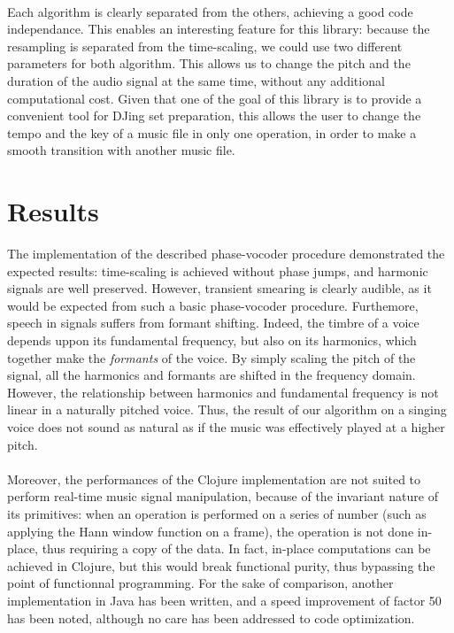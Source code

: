 \documentclass[letterpaper]{article}
\theoremstyle{definition}
\theoremstyle{remark}
\begin{document}
\paragraph{}
Each algorithm is clearly separated from the others, achieving a good code
independance. This enables an interesting feature for this library: because the
resampling is separated from the time-scaling, we could use two different
parameters for both algorithm. This allows us to change the pitch and the
duration of the audio signal at the same time, without any additional
computational cost. Given that one of the goal of this library is to provide a
convenient tool for DJing set preparation, this allows the user to change the
tempo and the key of a music file in only one operation, in order to make a
smooth transition with another music file.

\section{Results}
The implementation of the described phase-vocoder procedure demonstrated the
expected results: time-scaling is achieved without phase jumps, and harmonic
signals are well preserved. However, transient smearing is clearly audible, as
it would be expected from such a basic phase-vocoder procedure. Furthemore,
speech in signals suffers from formant shifting. Indeed, the timbre of a voice
depends uppon its fundamental frequency, but also on its harmonics, which
together make the \emph{formants} of the voice. By simply scaling the pitch
of the signal, all the harmonics and formants are shifted in the frequency
domain. However, the relationship between harmonics and fundamental frequency
is not linear in a naturally pitched voice. Thus, the result of our algorithm
on a singing voice does not sound as natural as if the music was effectively
played at a higher pitch.

\paragraph{}
Moreover, the performances of the Clojure implementation are not suited to
perform real-time music signal manipulation, because of the invariant nature of
its primitives: when an operation is performed on a series of number (such as
applying the Hann window function on a frame), the operation is not done
in-place, thus requiring a copy of the data. In fact, in-place computations can
be achieved in Clojure, but this would break functional purity, thus bypassing
the point of functionnal programming. For the sake of comparison, another
implementation in Java has been written, and a speed improvement of factor 50
has been noted, although no care has been addressed to code optimization.
\end{document}
